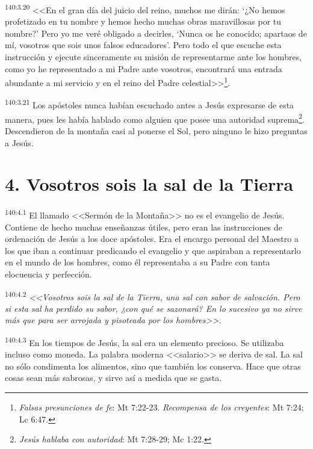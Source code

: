 \par 
\textsuperscript{140:3.20} <<En el gran día del juicio del reino, muchos me dirán: `¿No hemos profetizado en tu nombre y hemos hecho muchas obras maravillosas por tu nombre?' Pero yo me veré obligado a decirles, `Nunca os he conocido; apartaos de mí, vosotros que sois unos falsos educadores'. Pero todo el que escuche esta instrucción y ejecute sinceramente su misión de representarme ante los hombres, como yo he representado a mi Padre ante vosotros, encontrará una entrada abundante a mi servicio y en el reino del Padre celestial>>\footnote{\textit{Falsas presunciones de fe}: Mt 7:22-23. \textit{Recompensa de los creyentes}: Mt 7:24; Lc 6:47.}.

\par 
\textsuperscript{140:3.21} Los apóstoles nunca habían escuchado antes a Jesús expresarse de esta manera, pues les había hablado como alguien que posee una autoridad suprema\footnote{\textit{Jesús hablaba con autoridad}: Mt 7:28-29; Mc 1:22.}. Descendieron de la montaña casi al ponerse el Sol, pero ninguno le hizo preguntas a Jesús.

\section*{4. Vosotros sois la sal de la Tierra}
\par 
\textsuperscript{140:4.1} El llamado <<Sermón de la Montaña>> no es el evangelio de Jesús. Contiene de hecho muchas enseñanzas útiles, pero eran las instrucciones de ordenación de Jesús a los doce apóstoles. Era el encargo personal del Maestro a los que iban a continuar predicando el evangelio y que aspiraban a representarlo en el mundo de los hombres, como él representaba a su Padre con tanta elocuencia y perfección.

\par 
\textsuperscript{140:4.2} \textit{<<Vosotros sois la sal de la Tierra, una sal con sabor de salvación. Pero si esta sal ha perdido su sabor, ¿con qué se sazonará? En lo sucesivo ya no sirve más que para ser arrojada y pisoteada por los hombres>>.}

\par 
\textsuperscript{140:4.3} En los tiempos de Jesús, la sal era un elemento precioso. Se utilizaba incluso como moneda. La palabra moderna <<salario>> se deriva de sal. La sal no sólo condimenta los alimentos, sino que también los conserva. Hace que otras cosas sean más sabrosas, y sirve así a medida que se gasta.

